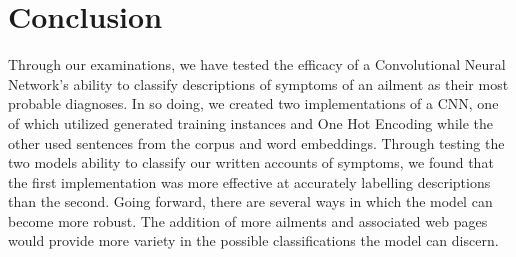 \documentclass[12pt]{report}
\begin{document}
\chapter{Conclusion}

Through our examinations, we have tested the efficacy of a Convolutional Neural
Network's ability to classify descriptions of symptoms of an ailment as their
most probable diagnoses. In so doing, we created two implementations of a CNN,
one of which utilized generated training instances and One Hot Encoding while
the other used sentences from the corpus and word embeddings. Through testing
the two models ability to classify our written accounts of symptoms, we found
that the first implementation was more effective at accurately labelling
descriptions than the second. Going forward, there are several ways in which the
model can become more robust. The addition of more ailments and associated web
pages would provide more variety in the possible classifications the model can
discern.

%
\end{document}
